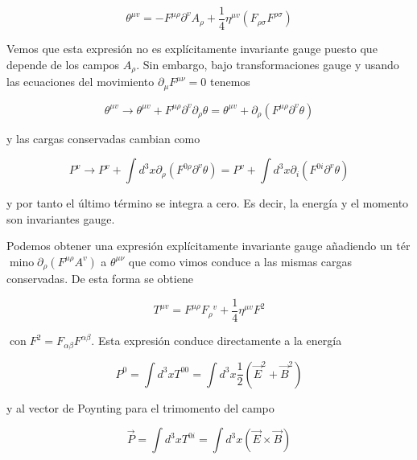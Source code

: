 \begin{equation*}
\theta^{\mu v}=-F^{\mu \rho} \partial^{v} A_{\rho}+\frac{1}{4} \eta^{\mu v}\left(F_{\rho \sigma} F^{\rho \sigma}\right) \tag{6.13}
\end{equation*}


Vemos que esta expresión no es explícitamente invariante gauge puesto que depende de los campos $A_{\rho}$. Sin embargo, bajo transformaciones gauge y usando las ecuaciones del movimiento $\partial_{\mu} F^{\mu \nu}=0$ tenemos

\begin{equation*}
\theta^{\mu v} \rightarrow \theta^{\mu v}+F^{\mu \rho} \partial^{v} \partial_{\rho} \theta=\theta^{\mu v}+\partial_{\rho}\left(F^{\mu \rho} \partial^{v} \theta\right) \tag{6.14}
\end{equation*}

y las cargas conservadas cambian como

\begin{equation*}
P^{v} \rightarrow P^{v}+\int d^{3} x \partial_{\rho}\left(F^{0 \rho} \partial^{v} \theta\right)=P^{v}+\int d^{3} x \partial_{i}\left(F^{0 i} \partial^{v} \theta\right) \tag{6.15}
\end{equation*}

y por tanto el último término se integra a cero. Es decir, la energía y el momento son invariantes gauge.

Podemos obtener una expresión explícitamente invariante gauge añadiendo un tér$\operatorname{mino} \partial_{\rho}\left(F^{\mu \rho} A^{v}\right)$ a $\theta^{\mu \nu}$ que como vimos conduce a las mismas cargas conservadas. De esta forma se obtiene

\begin{equation*}
T^{\mu v}=F^{\mu \rho} F_{\rho}{ }^{v}+\frac{1}{4} \eta^{\mu v} F^{2} \tag{6.16}
\end{equation*}

$\operatorname{con} F^{2}=F_{\alpha \beta} F^{\alpha \beta}$. Esta expresión conduce directamente a la energía

\begin{equation*}
P^{0}=\int d^{3} x T^{00}=\int d^{3} x \frac{1}{2}\left(\vec{E}^{2}+\vec{B}^{2}\right) \tag{6.17}
\end{equation*}

y al vector de Poynting para el trimomento del campo

\begin{equation*}
\vec{P}=\int d^{3} x T^{0 i}=\int d^{3} x(\vec{E} \times \vec{B}) \tag{6.18}
\end{equation*}

